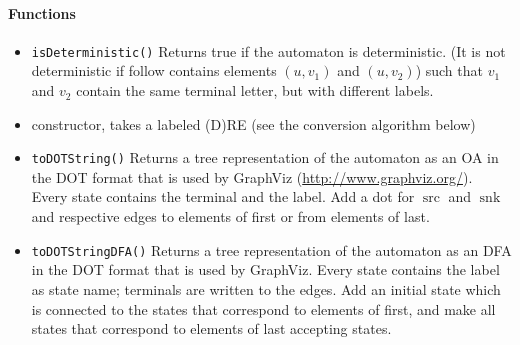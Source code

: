 \documentclass[a4paper,11pt, svgnames,titlepage]{article}
\DeclareMathOperator{\src}{src}
\DeclareMathOperator{\snk}{snk}
\begin{document}
\paragraph{Functions}
\begin{itemize}
	\item\texttt{isDeterministic()} Returns true if the automaton is deterministic. (It is not deterministic if follow contains elements $(u,v_1)$ and $(u,v_2)$) such that $v_1$ and $v_2$ contain the same terminal letter, but with different labels.
	\item constructor, takes a labeled (D)RE (see the conversion algorithm below)
	\item\texttt{toDOTString()} Returns a tree representation of the automaton as an OA in the DOT format that is used by GraphViz  (\url{http://www.graphviz.org/}). Every state contains the terminal and the label. Add a dot for $\src$ and $\snk$ and respective edges to elements of first or from elements of last.
	\item\texttt{toDOTStringDFA()} Returns a tree representation of the automaton as an DFA in the DOT format that is used by GraphViz. Every state contains the label as state name; terminals are written to the edges. Add an initial state which is connected to the states that correspond to elements of first, and make all states that correspond to elements of last accepting states.
\end{itemize}
\end{document}
